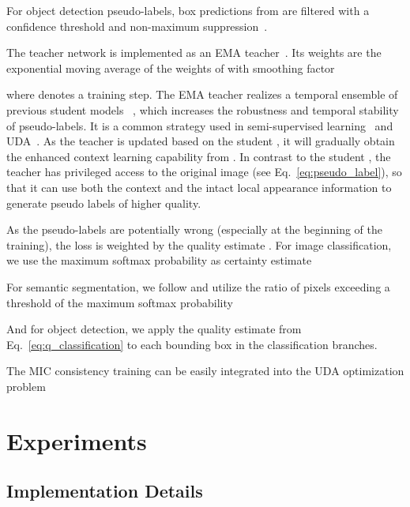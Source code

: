 \documentclass[10pt,twocolumn,letterpaper]{article}
\begin{document}
For object detection pseudo-labels, box predictions from  are filtered with a confidence threshold  and non-maximum suppression~\cite{ren2015faster}.

The teacher network  is implemented as an EMA teacher~\cite{tarvainen2017mean}. Its weights are the exponential moving average of the weights of  with smoothing factor 

where  denotes a training step. The EMA teacher realizes a temporal ensemble of previous student models ~\cite{tarvainen2017mean
}, which increases the robustness and temporal stability of pseudo-labels. It is a common strategy used in semi-supervised learning~\cite{tarvainen2017mean,french2019consistency,hoyer2021three} and UDA~\cite{araslanov2021self,tranheden2021dacs,hoyer2021daformer,hoyer2022hrda}.
As the teacher is updated based on the student , it will gradually obtain the enhanced context learning capability from . In contrast to the student , the teacher  has privileged access to the original image  (see Eq.~\ref{eq:pseudo_label}), 
so that it can use both the context and the intact local appearance information to generate pseudo labels of higher quality.

As the pseudo-labels are potentially wrong (especially at the beginning of the training), the loss is weighted by the quality estimate . For image classification, we use the maximum softmax probability as certainty estimate~\cite{zhang2018collaborative}

For semantic segmentation, we follow \cite{tranheden2021dacs,hoyer2021daformer,hoyer2022hrda} and utilize the ratio of pixels exceeding a threshold  of the maximum softmax probability

And for object detection, we apply the quality estimate from Eq.~\ref{eq:q_classification} to each bounding box in the classification branches.

The MIC consistency training can be easily integrated into the UDA optimization problem 

 
\section{Experiments}
\label{sec:experiments}

\subsection{Implementation Details}
\label{sec:implementation}
\end{document}

